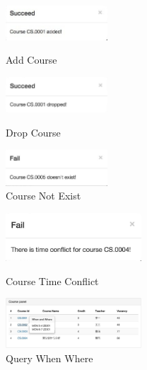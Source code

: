\documentclass[a4paper, 11pt, nofonts, nocap, fancyhdr]{ctexart}
\begin{document}
	\begin{figure}[ht]

		\begin{minipage}{0.3\textwidth}
			\centering
			\includegraphics[width=1.5in]{add}
			\caption{Add Course}
		\end{minipage}%
		\begin{minipage}{0.4\textwidth}
			\centering
			\includegraphics[width=1.5in]{drop}
			\caption{Drop Course}
		\end{minipage}%
		\begin{minipage}{0.3\textwidth}
			\centering
			\includegraphics[width=1.5in]{notexist}
			\caption{Course Not Exist}
		\end{minipage}
	\end{figure}
	\vspace{0.8cm}

	\begin{figure}

		\begin{minipage}{0.4\textwidth}
			\centering
			\includegraphics[width=2in]{timeconflict}
			\caption{Course Time Conflict}
		\end{minipage}%
		\begin{minipage}{0.6\textwidth}
			\centering
			\includegraphics[width=2in]{showtime}
			\caption{Query When Where}
		\end{minipage}

		\vspace{0.8cm}
	\end{figure}
\end{document}
